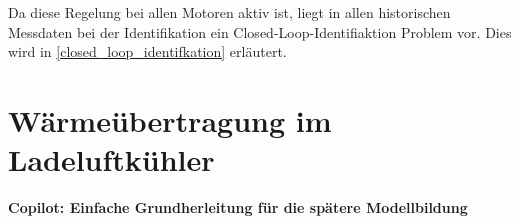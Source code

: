 Da diese Regelung bei allen Motoren aktiv ist, liegt in allen historischen Messdaten bei der Identifikation ein Closed-Loop-Identifiaktion Problem vor. Dies wird in \ref{closed_loop_identifkation} erläutert.




\section{Wärmeübertragung im Ladeluftkühler}
\label{ssec.grundlagen.luftpfad.waermeuebertragung}
\label{ssec.grundlagen.luftpfad.kennzahlen}
\label{ssec.grundlagen.terme.literatur}

\par\smallskip
\noindent\textbf{Copilot: Einfache Grundherleitung für die spätere Modellbildung}
\par\smallskip
